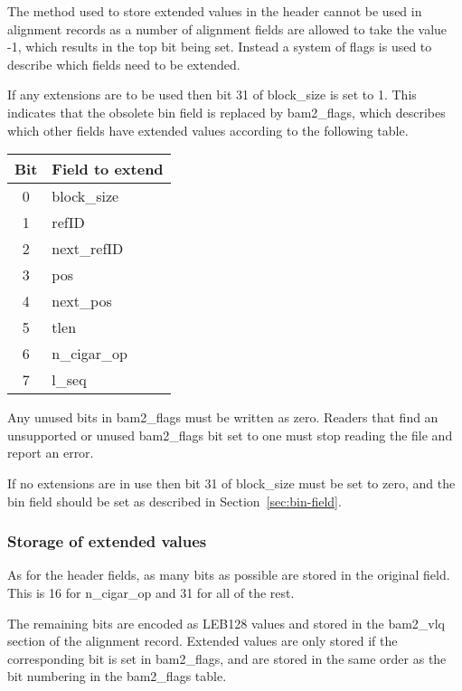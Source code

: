 \documentclass[10pt]{article}
\begin{document}
The method used to store extended values in the header cannot be used
in alignment records as a number of alignment fields are allowed to take
the value -1, which results in the top bit being set.
Instead a system of flags is used to describe which fields need to be extended.

If any extensions are to be used then bit 31 of {\sf block\_size} is set to 1.
This indicates that the obsolete {\sf bin} field is replaced by
{\sf bam2\_flags}, which describes which other fields have extended values
according to the following table.

\begin{table}[!ht]
\centering
\begin{tabular}{|c|l|}
\hline
{\bf Bit} & {\bf Field to extend}\\\hline
    0     & {\sf block\_size}    \\\hline
    1     & {\sf refID}          \\\hline
    2     & {\sf next\_refID}    \\\hline
    3     & {\sf pos}            \\\hline
    4     & {\sf next\_pos}      \\\hline
    5     & {\sf tlen}           \\\hline
    6     & {\sf n\_cigar\_op}   \\\hline
    7     & {\sf l\_seq}         \\\hline
\end{tabular}
\end{table}

Any unused bits in {\sf bam2\_flags} must be written as zero.
Readers that find an unsupported or unused {\sf bam2\_flags} bit set to
one must stop reading the file and report an error.

If no extensions are in use then bit 31 of {\sf block\_size} must be set to
zero, and the {\sf bin} field should be set as described in
Section~\ref{sec:bin-field}.

\subsubsection{Storage of extended values}\label{sec:v2-alignment-vals}

As for the header fields, as many bits as possible are stored in the
original field.
This is 16 for {\sf n\_cigar\_op} and 31 for all of the rest.

The remaining bits are encoded as LEB128 values and stored in the
{\sf bam2\_vlq} section of the alignment record.
Extended values are only stored if the corresponding bit is set in
{\sf bam2\_flags}, and are stored in the same order as the bit
numbering in the {\sf bam2\_flags} table.
\end{document}
